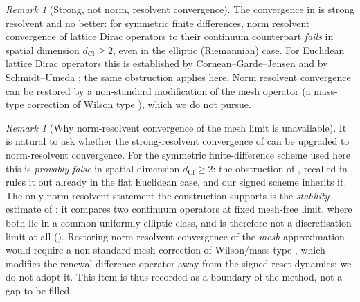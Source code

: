 \documentclass[11pt]{article}
\theoremstyle{definition}
\theoremstyle{remark}
\newtheorem{remark}[theorem]{Remark}
\newcommand{\dCl}{d_{\mathrm{Cl}}}
\begin{document}
\begin{remark}[Strong, not norm, resolvent convergence]
\label{rem:no-norm-resolvent}
The convergence in  is strong resolvent and no better:
for symmetric finite differences, norm resolvent convergence of lattice Dirac
operators to their continuum counterpart \emph{fails} in spatial dimension
$\dCl\ge2$, even in the elliptic (Riemannian) case.  For Euclidean lattice Dirac operators this is established by
Cornean--Garde--Jensen and by Schmidt--Umeda \cite{corneangardejensen2022,schmidtumeda2023}; the
same obstruction applies here.  Norm resolvent convergence can be restored by a
non-standard modification of the mesh operator (a mass-type correction of Wilson type
\cite{wilson1977}), which we do not pursue.
\end{remark}

\begin{remark}[Why norm-resolvent convergence of the mesh limit is unavailable]
\label{rem:norm-resolvent-status}
It is natural to ask whether the strong-resolvent convergence of
 can be upgraded to norm-resolvent convergence.  For
the symmetric finite-difference scheme used here this is \emph{provably false} in
spatial dimension $\dCl\ge2$: the obstruction of
\cite{corneangardejensen2022,schmidtumeda2023}, recalled in
, rules it out already in the flat Euclidean case,
and our signed scheme inherits it.  The only norm-resolvent statement the
construction supports is the \emph{stability} estimate of :
it compares two continuum operators at fixed mesh-free limit, where both lie in a
common uniformly elliptic class, and is therefore not a discretisation limit at
all ().  Restoring norm-resolvent convergence of the
\emph{mesh} approximation would require a non-standard mesh correction of
Wilson/mass type \cite{wilson1977}, which modifies the renewal difference operator away from the
signed reset dynamics; we do not adopt it.  This item is thus recorded as a
boundary of the method, not a gap to be filled.
\end{remark}
\end{document}
